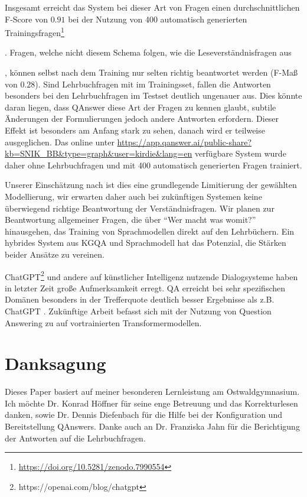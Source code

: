 \documentclass[utf8,biblatex]{lni}
\begin{document}
Insgesamt erreicht das System bei dieser Art von Fragen einen durchschnittlichen F-Score von $0.91$ bei der Nutzung von 400 automatisch generierten Trainingsfragen\footnote{\url{https://doi.org/10.5281/zenodo.7990554}}\addtocounter{footnote}{-1}\addtocounter{Hfootnote}{-1}.
Fragen, welche nicht diesem Schema folgen, wie die Leseverständnisfragen aus \cite{bb}\footnotemark{}\addtocounter{footnote}{-1}\addtocounter{Hfootnote}{-1}, können selbst nach dem Training nur selten richtig beantwortet werden (F-Maß von $0.28$)\footnotemark{}.
Sind Lehrbuchfragen mit im Trainingsset, fallen die Antworten besonders bei den Lehrbuchfragen im Testset deutlich ungenauer aus.
Dies könnte daran liegen, dass QAnswer diese Art der Fragen zu kennen glaubt, subtile Änderungen der Formulierungen jedoch andere Antworten erfordern.
Dieser Effekt ist besonders am Anfang stark zu sehen, danach wird er teilweise ausgeglichen.
Das online unter \url{https://app.qanswer.ai/public-share?kb=SNIK_BB&type=graph&user=kirdie&lang=en} verfügbare System wurde daher ohne Lehrbuchfragen und mit 400 automatisch generierten Fragen trainiert.

Unserer Einschätzung nach ist dies eine grundlegende Limitierung der gewählten Modellierung, wir erwarten daher auch bei zukünftigen Systemen keine überwiegend richtige Beantwortung der Verständnisfragen.
Wir planen zur Beantwortung allgemeiner Fragen, die über \enquote{Wer macht was womit?} hinausgehen, das Training von Sprachmodellen direkt auf den Lehrbüchern.
Ein hybrides System aus KGQA und Sprachmodell hat das Potenzial, die Stärken beider Ansätze zu vereinen.

ChatGPT\footnote{https://openai.com/blog/chatgpt} und andere auf künstlicher Intelligenz nutzende Dialogsysteme haben in letzter Zeit große Aufmerksamkeit erregt.
QA erreicht bei sehr spezifischen Domänen besonders in der Trefferquote deutlich besser Ergebnisse als z.B. ChatGPT \cite{gptvsqa}.
Zukünftige Arbeit befasst sich mit der Nutzung von Question Answering zu \cite{bb} auf vortrainierten Transformermodellen.

\section{Danksagung}

Dieses Paper basiert auf meiner besonderen Lernleistung am Ostwaldgymnasium.
Ich möchte Dr. Konrad Höffner für seine enge Betreuung und das Korrekturlesen danken, sowie Dr. Dennis Diefenbach für die Hilfe bei der Konfiguration und Bereitstellung QAnswers.
Danke auch an Dr. Franziska Jahn für die Berichtigung der Antworten auf die Lehrbuchfragen. 

\printbibliography
\end{document}
